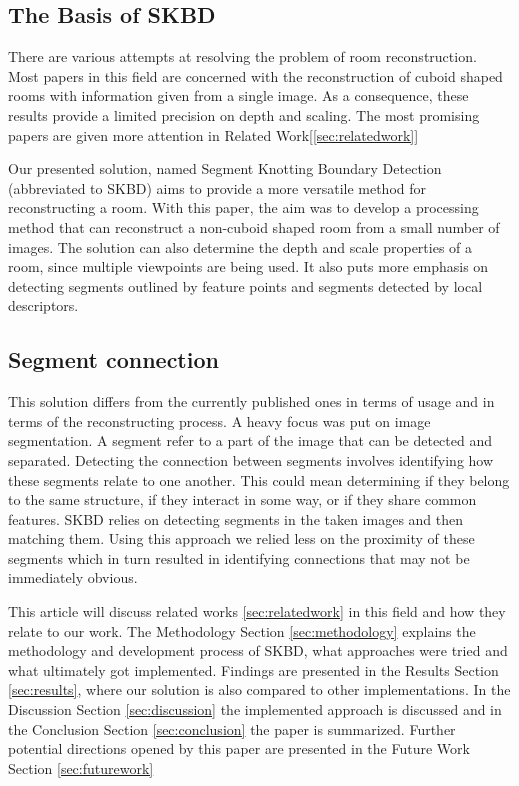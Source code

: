 \subsection{The Basis of SKBD} %
There are various attempts at resolving the problem of room reconstruction. Most papers in this field are concerned with the reconstruction of cuboid shaped rooms with information given from a single image. As a consequence, these results provide a limited precision on depth and scaling. The most promising papers are given more attention in Related Work[\ref{sec:relatedwork}]

Our presented solution, named Segment Knotting Boundary Detection (abbreviated to SKBD) aims to provide a more versatile method for reconstructing a room. With this paper, the aim was to develop a processing method that can reconstruct a non-cuboid shaped room from a small number of images. The solution can also determine the depth and scale properties of a room, since multiple viewpoints are being used. It also puts more emphasis on detecting segments outlined by feature points and segments detected by local descriptors. 

\subsection{Segment connection} %
This solution differs from the currently published ones in terms of usage and in terms of the reconstructing process. A heavy focus was put on image segmentation. A segment refer to a part of the image that can be detected and separated. Detecting the connection between segments involves identifying how these segments relate to one another. This could mean determining if they belong to the same structure, if they interact in some way, or if they share common features. SKBD relies on detecting segments in the taken images and then matching them. Using this approach we relied less on the proximity of these segments which in turn resulted in identifying connections that may not be immediately obvious.

This article will discuss related works \ref{sec:relatedwork} in this field and how they relate to our work.  The Methodology Section \ref{sec:methodology} explains the methodology and development process of SKBD, what approaches were tried and what ultimately got implemented.
    Findings are presented in the Results Section \ref{sec:results}, where our solution is also compared to other implementations. In the Discussion Section \ref{sec:discussion} the implemented approach is discussed and in the Conclusion Section \ref{sec:conclusion} the paper is summarized. Further potential directions opened by this paper are presented in the Future Work Section \ref{sec:futurework}
